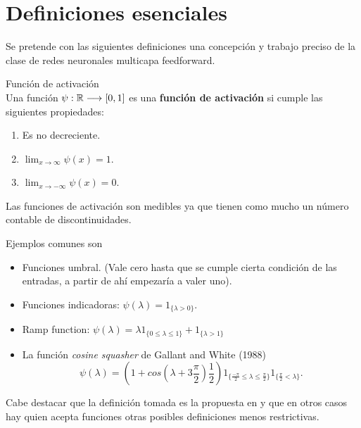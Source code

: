 %


\section{Definiciones esenciales}  

Se pretende con las siguientes definiciones una concepción y trabajo preciso de la clase de redes neuronales multicapa feedforward. 


\begin{definicion} Función de activación \\
    Una función  $\psi: \mathbb{R} \longrightarrow [0,1]$ es una \textbf{ función de activación} si  cumple las siguientes propiedades:
    \begin{enumerate}[label=(\roman*)]
        \item Es no decreciente.
        \item $\lim _{x \rightarrow \infty} \psi(x) = 1
        $.
        \item $\lim _{x \rightarrow -\infty} \psi(x) = 0$.
    \end{enumerate}  

    Las funciones de activación son medibles ya que tienen como mucho un número contable de discontinuidades.
   
    Ejemplos comunes son
    \begin{itemize}
        \item Funciones umbral. 
        (Vale cero hasta que se cumple cierta condición de las entradas, a partir de ahí empezaría a valer uno).

        \item Funciones indicadoras: $\psi(\lambda) = 1_{\{\lambda > 0\}}$. 
        \item Ramp function: $\psi(\lambda)  = \lambda 1_{\{0 \leq \lambda \leq  1\}} + 1_{\{\lambda > 1\}}$
    
        \item La función \textit{cosine squasher} de Gallant and White (1988)
        \begin{equation*}
    \psi(\lambda )= \left(1 + cos\left(\lambda + 3 \frac{\pi}{2} \right) \frac{1}{2}\right) 
     1_{\{\frac{-\pi}{2} \leq \lambda \leq  \frac{\pi}{2}\}}
     1_{\{ \frac{\pi}{2} < \lambda \}}.
    \end{equation*}
    \end{itemize}

    Cabe destacar que la definición tomada es la propuesta en \cite{HORNIK1989359} y que en otros casos 
    hay quien acepta funciones otras posibles definiciones menos restrictivas.
\end{definicion}

